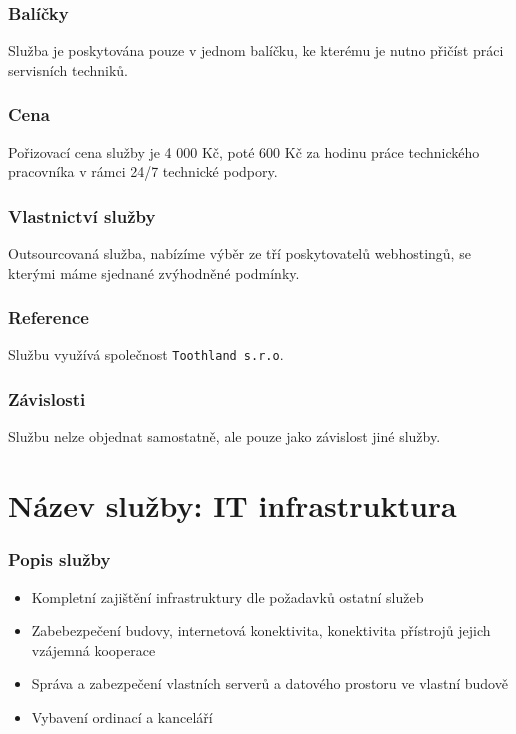 \documentclass[11pt, a4paper, titlepage]{article}
\begin{document}
	\subsubsection*{Balíčky}
	Služba je poskytována pouze v jednom balíčku, ke kterému je nutno přičíst práci servisních techniků. 

	\subsubsection*{Cena}
	Pořizovací cena služby je 4 000 Kč, poté 600 Kč za hodinu práce technického pracovníka v rámci 24/7 technické podpory.

	\subsubsection*{Vlastnictví služby}
	Outsourcovaná služba, nabízíme výběr ze tří poskytovatelů webhostingů, se kterými máme sjednané zvýhodněné podmínky.

	\subsubsection*{Reference}
	Službu využívá společnost \texttt{Toothland s.r.o}.

	\subsubsection*{Závislosti}
	Službu nelze objednat samostatně, ale pouze jako závislost jiné služby.

	\section*{Název služby: IT infrastruktura}

	\subsubsection*{Popis služby}
	\begin{itemize}
		\item Kompletní zajištění infrastruktury dle požadavků ostatní služeb
		\item Zabebezpečení budovy, internetová konektivita, konektivita přístrojů jejich vzájemná kooperace
		\item Správa a zabezpečení vlastních serverů a datového prostoru ve vlastní budově
		\item Vybavení ordinací a kanceláří
	\end{itemize}
\end{document}
